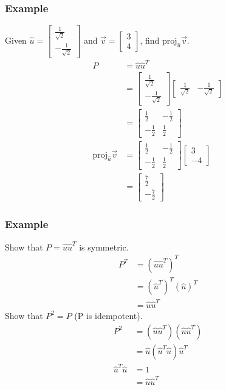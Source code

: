 \documentclass{math}
\begin{document}
\subsubsection*{Example}
Given \( \hat{u} = \begin{bmatrix}\frac{1}{\sqrt{2}} \\
-\frac{1}{\sqrt{2}}\end{bmatrix} \) and \( \vec{v} = \begin{bmatrix}3 \\
4\end{bmatrix} \), find \( \text{proj}_{\hat{u}}\vec{v} \).
\begin{align*}
  P &= \hat{u}\hat{u}^T \\
  &= \begin{bmatrix}
    \frac{1}{\sqrt{2}} \\ -\frac{1}{\sqrt{2}}
  \end{bmatrix}\begin{bmatrix}
    \frac{1}{\sqrt{2}} & -\frac{1}{\sqrt{2}}
  \end{bmatrix} \\
  &= \begin{bmatrix}
    \frac{1}{2} & -\frac{1}{2} \\
    -\frac{1}{2} & \frac{1}{2}
  \end{bmatrix} \\
  \text{proj}_{\hat{u}}\vec{v} &= \begin{bmatrix}
    \frac{1}{2} & -\frac{1}{2} \\
    -\frac{1}{2} & \frac{1}{2}
  \end{bmatrix}\begin{bmatrix}
    3 \\ -4
  \end{bmatrix} \\
  &= \begin{bmatrix}
    \frac{7}{2} \\ -\frac{7}{2}
  \end{bmatrix}
\end{align*}

\subsubsection*{Example}
Show that \( P = \hat{u}\hat{u}^T \) is symmetric.
\begin{align*}
  P^T &= (\hat{u}\hat{u}^T)^T \\
  &= (\hat{u}^T)^T(\hat{u})^T \\
  &= \hat{u}\hat{u}^T
\end{align*}
Show that \( P^2 = P \) (P is idempotent).
\begin{align*}
  P^2 &= (\hat{u}\hat{u}^T)(\hat{u}\hat{u}^T) \\
  &= \hat{u}(\hat{u}^T\hat{u})\hat{u}^T \\
  \hat{u}^T\hat{u} &= 1 \\
  &= \hat{u}\hat{u}^T
\end{align*}
\end{document}

